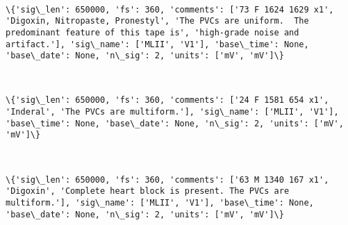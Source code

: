\documentclass[11pt]{article}
\begin{document}
    \begin{center}
    \end{center}
    { \hspace*{\fill} \\}
    
    \begin{Verbatim}[commandchars=\\\{\}]
\{'sig\_len': 650000, 'fs': 360, 'comments': ['73 F 1624 1629 x1', 'Digoxin, Nitropaste, Pronestyl', 'The PVCs are uniform.  The predominant feature of this tape is', 'high-grade noise and artifact.'], 'sig\_name': ['MLII', 'V1'], 'base\_time': None, 'base\_date': None, 'n\_sig': 2, 'units': ['mV', 'mV']\}

    \end{Verbatim}

    \begin{center}
    \end{center}
    { \hspace*{\fill} \\}
    
    \begin{Verbatim}[commandchars=\\\{\}]
\{'sig\_len': 650000, 'fs': 360, 'comments': ['24 F 1581 654 x1', 'Inderal', 'The PVCs are multiform.'], 'sig\_name': ['MLII', 'V1'], 'base\_time': None, 'base\_date': None, 'n\_sig': 2, 'units': ['mV', 'mV']\}

    \end{Verbatim}

    \begin{center}
    \end{center}
    { \hspace*{\fill} \\}
    
    \begin{Verbatim}[commandchars=\\\{\}]
\{'sig\_len': 650000, 'fs': 360, 'comments': ['63 M 1340 167 x1', 'Digoxin', 'Complete heart block is present. The PVCs are multiform.'], 'sig\_name': ['MLII', 'V1'], 'base\_time': None, 'base\_date': None, 'n\_sig': 2, 'units': ['mV', 'mV']\}

    \end{Verbatim}

    \begin{center}
    \end{center}
    { \hspace*{\fill} \\}
    
\end{document}
